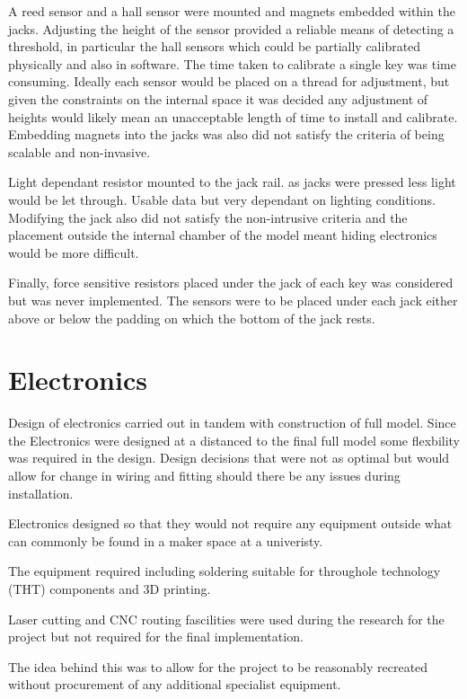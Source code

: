 A reed sensor and a hall sensor were mounted and magnets embedded within
the jacks. Adjusting the height of the sensor provided a reliable means
of detecting a threshold, in particular the hall sensors which could be
partially calibrated physically and also in software. The time taken to
calibrate a single key was time consuming. Ideally each sensor would be
placed on a thread for adjustment, but given the constraints on the
internal space it was decided any adjustment of heights would likely
mean an unacceptable length of time to install and calibrate. Embedding
magnets into the jacks was also did not satisfy the criteria of being
scalable and non-invasive.

Light dependant resistor mounted to the jack rail. as jacks were pressed
less light would be let through. Usable data but very dependant on
lighting conditions. Modifying the jack also did not satisfy the
non-intrusive criteria and the placement outside the internal chamber of
the model meant hiding electronics would be more difficult.

Finally, force sensitive resistors placed under the jack of each key was
considered but was never implemented. The sensors were to be placed
under each jack either above or below the padding on which the bottom of
the jack rests. 


\section{Electronics}\label{electronics}

Design of electronics carried out in tandem with construction of full
model. Since the Electronics were designed at a distanced to the final
full model some flexbility was required in the design. Design decisions
that were not as optimal but would allow for change in wiring and
fitting should there be any issues during installation.

Electronics designed so that they would not require any equipment
outside what can commonly be found in a maker space at a univeristy.

The equipment required including soldering suitable for throughole
technology (THT) components and 3D printing.

Laser cutting and CNC routing fascilities were used during the research
for the project but not required for the final implementation.

The idea behind this was to allow for the project to be reasonably
recreated without procurement of any additional specialist equipment.

